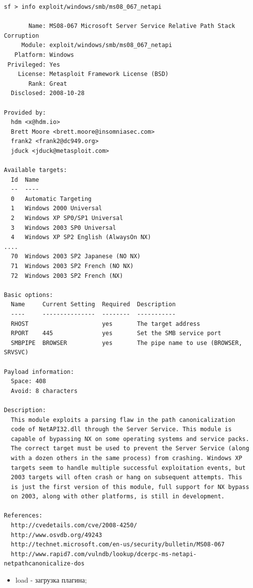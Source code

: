 \documentclass[10pt,a4paper,titlepage]{article}
\begin{document}
\begin{verbatim}
sf > info exploit/windows/smb/ms08_067_netapi

       Name: MS08-067 Microsoft Server Service Relative Path Stack Corruption
     Module: exploit/windows/smb/ms08_067_netapi
   Platform: Windows
 Privileged: Yes
    License: Metasploit Framework License (BSD)
       Rank: Great
  Disclosed: 2008-10-28

Provided by:
  hdm <x@hdm.io>
  Brett Moore <brett.moore@insomniasec.com>
  frank2 <frank2@dc949.org>
  jduck <jduck@metasploit.com>

Available targets:
  Id  Name
  --  ----
  0   Automatic Targeting
  1   Windows 2000 Universal
  2   Windows XP SP0/SP1 Universal
  3   Windows 2003 SP0 Universal
  4   Windows XP SP2 English (AlwaysOn NX)
....
  70  Windows 2003 SP2 Japanese (NO NX)
  71  Windows 2003 SP2 French (NO NX)
  72  Windows 2003 SP2 French (NX)

Basic options:
  Name     Current Setting  Required  Description
  ----     ---------------  --------  -----------
  RHOST                     yes       The target address
  RPORT    445              yes       Set the SMB service port
  SMBPIPE  BROWSER          yes       The pipe name to use (BROWSER, SRVSVC)

Payload information:
  Space: 408
  Avoid: 8 characters

Description:
  This module exploits a parsing flaw in the path canonicalization 
  code of NetAPI32.dll through the Server Service. This module is 
  capable of bypassing NX on some operating systems and service packs. 
  The correct target must be used to prevent the Server Service (along 
  with a dozen others in the same process) from crashing. Windows XP 
  targets seem to handle multiple successful exploitation events, but 
  2003 targets will often crash or hang on subsequent attempts. This 
  is just the first version of this module, full support for NX bypass 
  on 2003, along with other platforms, is still in development.

References:
  http://cvedetails.com/cve/2008-4250/
  http://www.osvdb.org/49243
  http://technet.microsoft.com/en-us/security/bulletin/MS08-067
  http://www.rapid7.com/vulndb/lookup/dcerpc-ms-netapi-netpathcanonicalize-dos

\end{verbatim}
\begin{itemize}
\item load - загрузка плагина;
\end{itemize}
\end{document}
